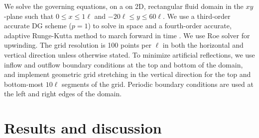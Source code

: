 \documentclass{jfm}%
\begin{document}
We solve the governing equations, on a on 2D, rectangular fluid domain
in the $xy$-plane such that $0 \leq x \leq 1\ell$ and
$-20\ell \leq y \leq 60\ell$. We use a third-order accurate \ac{DG}
scheme ($p=1$) to solve in space and a fourth-order accurate, adaptive
Runge-Kutta method to march forward in time
\citep{HenrydeFrahan2015}. We use Roe solver for upwinding. The grid
resolution is 100 points per $\ell$ in both the horizontal and
vertical direction unless otherwise stated. To minimize artificial
reflections, we use inflow and outflow boundary conditions at the top
and bottom of the domain, and implement geometric grid stretching in
the vertical direction for the top and bottom-most $10\ell$ segments
of the grid. Periodic boundary conditions are used at the left and
right edges of the domain.

% 
\section{Results and discussion}%
\label{sec:results}%
% 
\end{document}
